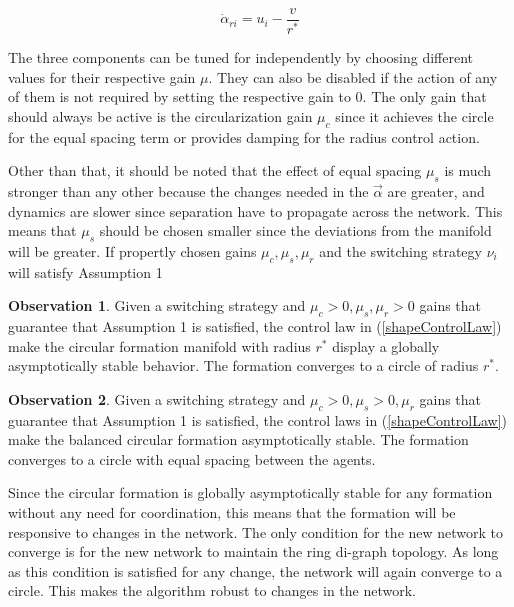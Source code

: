 \begin{equation}
\label{radius}
\dot{\alpha}_{ri} =  u_i - \frac{v}{r^*}
\end{equation}

The three components can be tuned for independently by choosing different values for their respective gain $\mu$. They can also be disabled if the action of any of them is not required by setting the respective gain to 0. The only gain that should always be active is the circularization gain $\mu_c$ since it achieves the circle for the equal spacing term or provides damping for the radius control action. 

Other than that, it should be noted that the effect of equal spacing $\mu_s$ is much stronger than any other because the changes needed in the $\vec{\alpha}$ are greater, and dynamics are slower since separation have to propagate across the network. This means that $\mu_s$ should be chosen smaller since the deviations from the manifold will be greater. If propertly chosen gains $\mu_c, \mu_s, \mu_r$ and the switching strategy $\nu_{i}$ will satisfy Assumption 1

\textbf{Observation 1}. Given a switching strategy and $\mu_c>0, \mu_s, \mu_r>0$ gains that guarantee that Assumption 1 is satisfied, the control law in (\ref{shapeControlLaw}) make the circular formation manifold with radius $r^*$ display a globally asymptotically stable behavior. The formation converges to a circle of radius $r^*$.

\textbf{Observation 2}. Given a switching strategy and $\mu_c>0, \mu_s>0, \mu_r$ gains that guarantee that Assumption 1 is satisfied, the control laws in (\ref{shapeControlLaw}) make the balanced circular formation asymptotically stable. The formation converges to a circle with equal spacing between the agents.

Since the circular formation is globally asymptotically stable for any formation without any need for coordination, this means that the formation will be responsive to changes in the network. The only condition for the new network to converge is for the new network to maintain the ring di-graph topology. As long as this condition is satisfied for any change, the network will again converge to a circle. This makes the algorithm robust to changes in the network.
